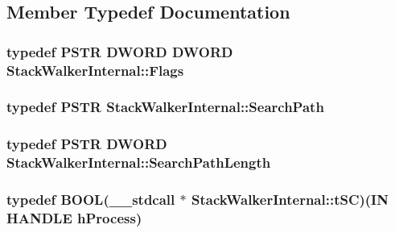 \subsection{Member Typedef Documentation}
\hypertarget{class_stack_walker_internal_a9c7d52fea4e78faacc6ecf000a0b5266}{
\subsubsection[{Flags}]{\setlength{\rightskip}{0pt plus 5cm}typedef P\-S\-T\-R {\bf D\-W\-O\-R\-D} {\bf D\-W\-O\-R\-D} {\bf Stack\-Walker\-Internal\-::\-Flags}}}\label{class_stack_walker_internal_a9c7d52fea4e78faacc6ecf000a0b5266}
\hypertarget{class_stack_walker_internal_a92b737e885d1111ac51498ca69133437}{
\subsubsection[{Search\-Path}]{\setlength{\rightskip}{0pt plus 5cm}typedef P\-S\-T\-R {\bf Stack\-Walker\-Internal\-::\-Search\-Path}}}\label{class_stack_walker_internal_a92b737e885d1111ac51498ca69133437}
\hypertarget{class_stack_walker_internal_aea12f621da977e6943a2a02fc153cd8a}{
\subsubsection[{Search\-Path\-Length}]{\setlength{\rightskip}{0pt plus 5cm}typedef P\-S\-T\-R {\bf D\-W\-O\-R\-D} {\bf Stack\-Walker\-Internal\-::\-Search\-Path\-Length}}}\label{class_stack_walker_internal_aea12f621da977e6943a2a02fc153cd8a}
\hypertarget{class_stack_walker_internal_a9242b91e8d2d617d958977c3a7551ecc}{
\subsubsection[{t\-S\-C}]{\setlength{\rightskip}{0pt plus 5cm}typedef {\bf B\-O\-O\-L}(\-\_\-\-\_\-stdcall $\ast$ Stack\-Walker\-Internal\-::t\-S\-C)(I\-N H\-A\-N\-D\-L\-E h\-Process)}}\label{class_stack_walker_internal_a9242b91e8d2d617d958977c3a7551ecc}
